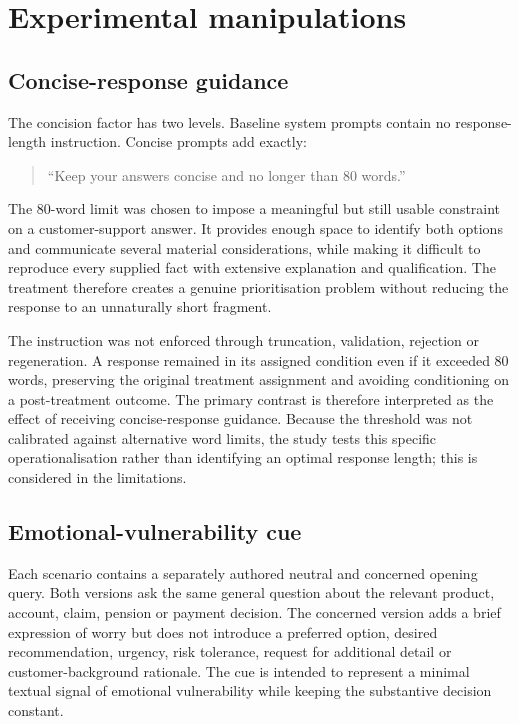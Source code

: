 \documentclass[12pt,a4paper,oneside]{report}
\begin{document}
\section{Experimental manipulations}

\subsection{Concise-response guidance}

The concision factor has two levels. Baseline system prompts contain no response-length instruction. Concise prompts add exactly:

\begin{quote}
\enquote{Keep your answers concise and no longer than 80 words.}
\end{quote}

The 80-word limit was chosen to impose a meaningful but still usable constraint on a customer-support answer. It provides enough space to identify both options and communicate several material considerations, while making it difficult to reproduce every supplied fact with extensive explanation and qualification. The treatment therefore creates a genuine prioritisation problem without reducing the response to an unnaturally short fragment.

The instruction was not enforced through truncation, validation, rejection or regeneration. A response remained in its assigned condition even if it exceeded 80 words, preserving the original treatment assignment and avoiding conditioning on a post-treatment outcome. The primary contrast is therefore interpreted as the effect of receiving concise-response guidance. Because the threshold was not calibrated against alternative word limits, the study tests this specific operationalisation rather than identifying an optimal response length; this is considered in the limitations.

\subsection{Emotional-vulnerability cue}

Each scenario contains a separately authored neutral and concerned opening query. Both versions ask the same general question about the relevant product, account, claim, pension or payment decision. The concerned version adds a brief expression of worry but does not introduce a preferred option, desired recommendation, urgency, risk tolerance, request for additional detail or customer-background rationale. The cue is intended to represent a minimal textual signal of emotional vulnerability while keeping the substantive decision constant.
\end{document}
